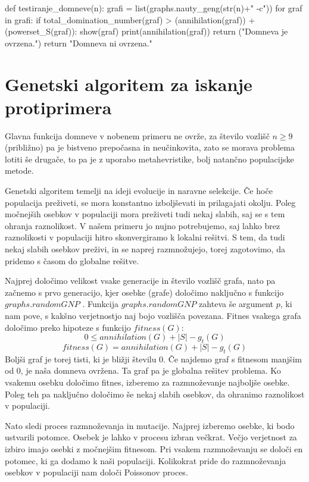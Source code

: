 \documentclass[11pt, a4paper]{article}
\begin{document}
\begin{spverbatim}
def testiranje_domneve(n):
    grafi = list(graphs.nauty_geng(str(n)+" -c"))
    for graf in grafi:
        if total_domination_number(graf) > (annihilation(graf)) + (powerset_S(graf)):
            show(graf)
            print(annihilation(graf))
            return ("Domneva je ovrzena.")
    return "Domneva ni ovrzena."
\end{spverbatim}

\section{\textbf{Genetski algoritem za iskanje protiprimera}}
Glavna funkcija domneve v nobenem primeru ne ovrže, za število vozlišč $n \geq 9$ (približno) pa je bistveno prepočasna in neučinkovita, zato se morava problema lotiti še drugače, to pa je z uporabo metahevristike, bolj natančno populacijske metode.
\newline

\noindent Genetski algoritem temelji na ideji evolucije in naravne selekcije. Če hoče populacija preživeti, se mora konstantno izboljševati in prilagajati okolju. Poleg močnejših osebkov v populaciji mora preživeti tudi nekaj slabih, saj se s tem ohranja raznolikost. V našem primeru jo nujno potrebujemo, saj lahko brez raznolikosti v populaciji hitro skonvergiramo k lokalni rešitvi. S tem, da tudi nekaj slabih osebkov preživi, in se naprej razmnožujejo, torej zagotovimo, da pridemo s časom do globalne rešitve. 
\newline

\noindent Najprej določimo velikost vsake generacije in število vozlišč grafa, nato pa začnemo s prvo generacijo, kjer osebke (grafe) določimo naključno s funkcijo $graphs.randomGNP$ . Funkcija $ graphs.randomGNP$ zahteva še argument $p$, ki nam pove, s kakšno verjetnostjo naj bojo vozlišča povezana. Fitnes vsakega grafa določimo preko hipoteze s funkcijo $fitness(G)$:
$$ 0 \leq annihilation(G) + |S| - g_t(G) $$
$$ fitness(G) = annihilation(G) + |S| - g_t(G) $$
Boljši graf je torej tisti, ki je bližji številu 0. Če najdemo graf s fitnesom manjšim od 0, je naša domneva ovržena. Ta graf pa je globalna rešitev problema. Ko vsakemu osebku določimo fitnes, izberemo za razmnoževanje najboljše osebke. Poleg teh pa naključno določimo še nekaj slabih osebkov, da ohranimo raznolikost v populaciji. 
\newline

\noindent Nato sledi proces razmnoževanja in mutacije. Najprej izberemo osebke, ki bodo ustvarili potomce. Osebek je lahko v procesu izbran večkrat. Večjo verjetnost za izbiro imajo osebki z močnejšim fitnesom. Pri vsakem razmnoževanju se določi en potomec, ki ga dodamo k naši populaciji. Kolikokrat pride do razmnoževanja osebkov v populaciji nam določi Poissonov proces.
\newline
 
\end{document}
